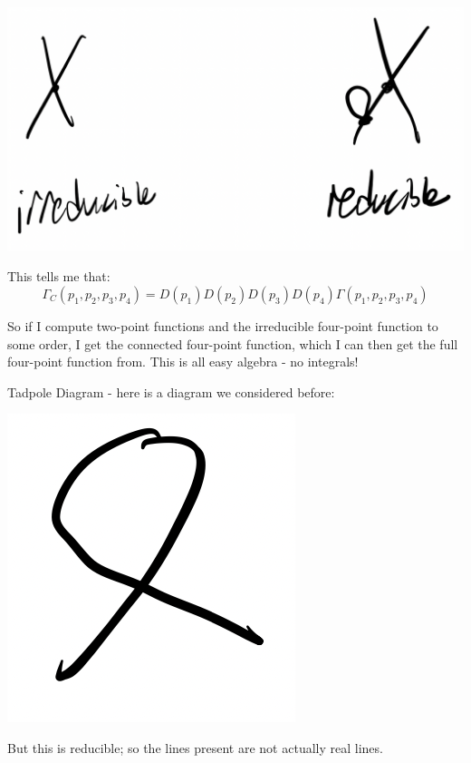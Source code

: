 \begin{center}
\includegraphics[scale=0.3]{Images/fig-lec28feynman3.png}
\end{center}

This tells me that:
\begin{equation}
    \Gamma_C(p_1, p_2, p_3, p_4) = D(p_1)D(p_2)D(p_3)D(p_4)\Gamma(p_1, p_2, p_3, p_4)
\end{equation}

So if I compute two-point functions and the irreducible four-point function to some order, I get the connected four-point function, which I can then get the full four-point function from. This is all easy algebra - no integrals!

Tadpole Diagram - here is a diagram we considered before:

\begin{center}
\includegraphics[scale=0.3]{Images/fig-lec28feynman4.png}
\end{center}

But this is reducible; so the lines present are not actually real lines.


